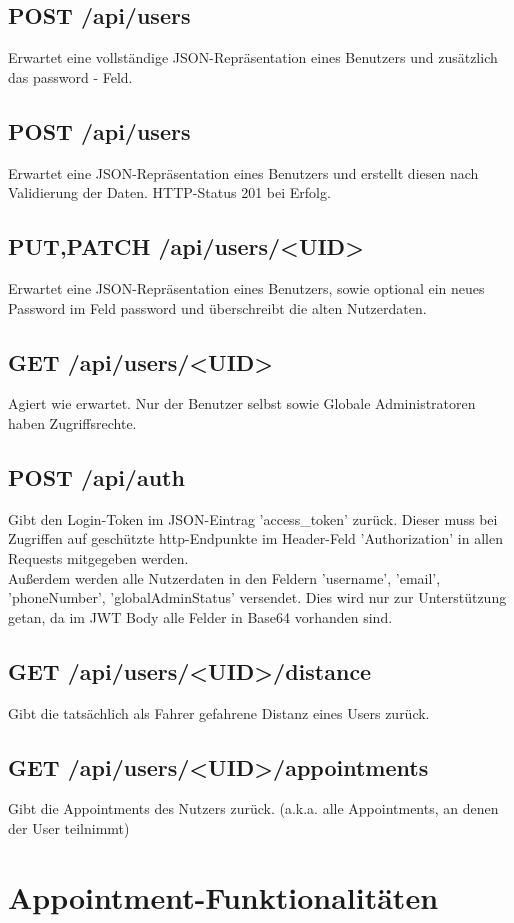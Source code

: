 \documentclass[11pt,a4paper]{article}
\begin{document}
\subsection{\textbf{POST} /api/users}
Erwartet eine vollständige JSON-Repräsentation eines Benutzers und zusätzlich das password - Feld.

\subsection{\textbf{POST} /api/users}
Erwartet eine JSON-Repräsentation eines Benutzers und erstellt diesen nach Validierung der Daten. HTTP-Status 201 bei Erfolg.
\subsection{\textbf{PUT,PATCH} /api/users/<UID>}
Erwartet eine JSON-Repräsentation eines Benutzers, sowie optional ein neues Password im Feld password und überschreibt die alten Nutzerdaten.
\subsection{\textbf{GET} /api/users/<UID>}
Agiert wie erwartet. Nur der Benutzer selbst sowie Globale Administratoren haben Zugriffsrechte.
\subsection{\textbf{POST} /api/auth}
Gibt den Login-Token im JSON-Eintrag 'access\_token' zurück. Dieser muss bei Zugriffen auf geschützte http-Endpunkte im Header-Feld 'Authorization' in allen Requests mitgegeben werden.\\
Außerdem werden alle Nutzerdaten in den Feldern 'username', 'email', 'phoneNumber', 'globalAdminStatus' versendet. Dies wird nur zur Unterstützung getan, da im JWT Body alle Felder in Base64 vorhanden sind.
\subsection{\textbf{GET} /api/users/<UID>/distance}
Gibt die tatsächlich als Fahrer gefahrene Distanz eines Users zurück.
\subsection{\textbf{GET} /api/users/<UID>/appointments}
Gibt die Appointments des Nutzers zurück. (a.k.a. alle Appointments, an denen der User teilnimmt)
\section{Appointment-Funktionalitäten}
\end{document}
